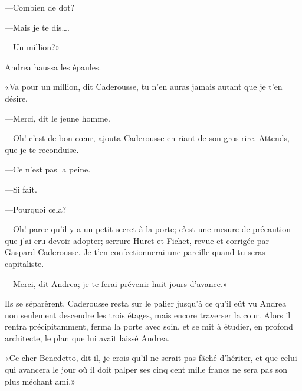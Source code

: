 —Combien de dot? 

—Mais je te dis\dots. 

—Un million?» 

Andrea haussa les épaules. 

«Va pour un million, dit Caderousse, tu n'en auras jamais autant que je t'en désire. 

—Merci, dit le jeune homme. 

—Oh! c'est de bon cœur, ajouta Caderousse en riant de son gros rire. Attends, que je te reconduise. 

—Ce n'est pas la peine. 

—Si fait. 

—Pourquoi cela? 

—Oh! parce qu'il y a un petit secret à la porte; c'est une mesure de précaution que j'ai cru devoir adopter; serrure Huret et Fichet, revue et corrigée par Gaspard Caderousse. Je t'en confectionnerai une pareille quand tu seras capitaliste. 

—Merci, dit Andrea; je te ferai prévenir huit jours d'avance.» 

Ils se séparèrent. Caderousse resta sur le palier jusqu'à ce qu'il eût vu Andrea non seulement descendre les trois étages, mais encore traverser la cour. Alors il rentra précipitamment, ferma la porte avec soin, et se mit à étudier, en profond architecte, le plan que lui avait laissé Andrea. 

«Ce cher Benedetto, dit-il, je crois qu'il ne serait pas fâché d'hériter, et que celui qui avancera le jour où il doit palper ses cinq cent mille francs ne sera pas son plus méchant ami.» 